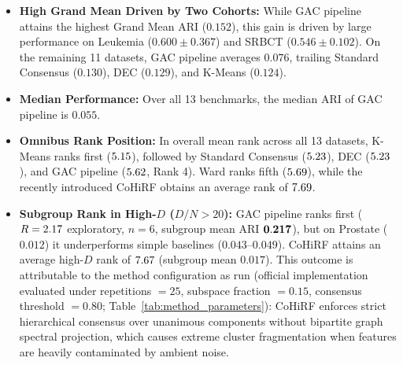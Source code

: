 \documentclass[pdflatex,sn-mathphys-num]{sn-jnl}
\theoremstyle{thmstyleone}
\theoremstyle{thmstyletwo}
\theoremstyle{thmstylethree}
\begin{document}
\begin{itemize}
 \item \textbf{High Grand Mean Driven by Two Cohorts:} While GAC pipeline attains the highest Grand Mean ARI ($0.152$), this gain is driven by large performance on Leukemia ($0.600 \pm 0.367$) and SRBCT ($0.546 \pm 0.102$). On the remaining 11 datasets, GAC pipeline averages $0.076$, trailing Standard Consensus ($0.130$), DEC ($0.129$), and K-Means ($0.124$).
 \item \textbf{Median Performance:} Over all 13 benchmarks, the median ARI of GAC pipeline is $0.055$.
 \item \textbf{Omnibus Rank Position:} In overall mean rank across all 13 datasets, K-Means ranks first ($5.15$), followed by Standard Consensus ($5.23$), DEC ($5.23$), and GAC pipeline ($5.62$, Rank 4). Ward ranks fifth ($5.69$), while the recently introduced CoHiRF obtains an average rank of $7.69$.
 \item \textbf{Subgroup Rank in High-$D$ ($D/N > 20$):} GAC pipeline ranks first ($R = 2.17$ exploratory, $n=6$, subgroup mean ARI $\mathbf{0.217}$), but on Prostate ($0.012$) it underperforms simple baselines ($0.043\text{--}0.049$). CoHiRF attains an average high-$D$ rank of $7.67$ (subgroup mean $0.017$). This outcome is attributable to the method configuration as run (official implementation evaluated under repetitions $= 25$, subspace fraction $= 0.15$, consensus threshold $= 0.80$; Table~\ref{tab:method_parameters}): CoHiRF enforces strict hierarchical consensus over unanimous components without bipartite graph spectral projection, which causes extreme cluster fragmentation when features are heavily contaminated by ambient noise.

\end{itemize}
\end{document}
